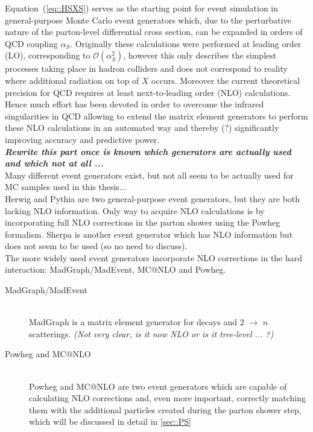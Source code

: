 Equation~(\ref{eq::HSXS}) serves as the starting point for event simulation in general-purpose Monte Carlo event generators which, due to the perturbative nature of the parton-level differential cross section, can be expanded in orders of QCD coupling $\alpha_{S}$. Originally these calculations were performed at leading order (LO), corresponding to $\mathcal{O}(\alpha_{S}^{2})$, however this only describes the simplest processes taking place in hadron colliders and does not correspond to reality where additional radiation on top of $X$ occurs. Moreover the current theoretical precision for QCD requires at least next-to-leading order (NLO) calculations. Hence much effort has been devoted in order to overcome the infrared singularities in QCD allowing to extend the matrix element generators to perform these NLO calculations in an automated way and thereby (?) significantly improving accuracy and predictive power.\\

\textit{\textbf{Rewrite this part once is known which generators are actually used and which not at all ...\\}}
Many different event generators exist, but not all seem to be actually used for MC samples used in this thesis...\\
Herwig and Pythia are two general-purpose event generators, but they are both lacking NLO information. Only way to acquire NLO calculations is by incorporating full NLO corrections in the parton shower using the Powheg formalism. Sherpa is another event generator which has NLO information but does not seem to be used (so no need to discuss).\\
The more widely used event generators incorporate NLO corrections in the hard interaction: MadGraph/MadEvent, MC@NLO and Powheg.

\begin{myindentpar}
  \begin{description}
    \item[MadGraph/MadEvent] \hfill \\
      MadGraph is a matrix element generator for decays and $2$ $\rightarrow$ $n$ scatterings. \textit{(Not very clear, is it now NLO or is it tree-level ... ?)}
    \item[Powheg and MC@NLO] \hfill \\
      Powheg and MC@NLO are two event generators which are capable of calculating NLO corrections and, even more important, correctly matching them with the additional particles created during the parton shower step, which will be discussed in detail in \ref{sec::PS}
  \end{description}
\end{myindentpar}

